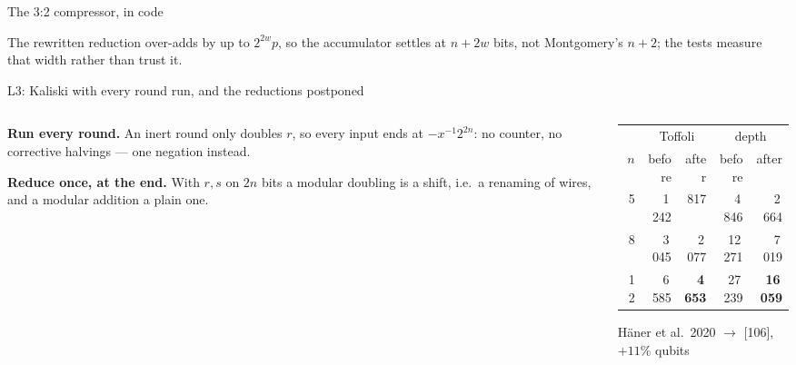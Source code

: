 \documentclass[aspectratio=169,11pt]{beamer}
\newcommand{\code}[2][]{}
\begin{document}
\setcounter{framenumber}{85}
\begin{frame}[fragile]{The 3:2 compressor, in code}
  \code[basicstyle=\ttfamily\fontsize{7.6}{8.8}\selectfont]{csa.py}
  {\small The rewritten reduction over-adds by up to $2^{2w}p$, so the accumulator settles at $n+2w$ bits, not Montgomery's $n+2$; the tests measure that width rather than trust it.}
\end{frame}

\setcounter{framenumber}{86}
\begin{frame}[fragile]{L3: Kaliski with every round run, and the reductions postponed}
  \begin{columns}[T]
    \begin{column}{0.54\textwidth}
      \small
      \textbf{Run every round.} An inert round only doubles $r$, so every input ends at $-x^{-1}2^{2n}$: no counter, no corrective halvings --- one negation instead.\par\vskip1mm
      \textbf{Reduce once, at the end.} With $r,s$ on $2n$ bits a modular doubling is a shift, i.e.\ a renaming of wires, and a modular addition a plain one.
    \end{column}
    \begin{column}{0.42\textwidth}
      \centering\footnotesize
      \renewcommand{\arraystretch}{1.08}
      \begin{tabular}{@{}rrrrr@{}}
        \toprule
        & \multicolumn{2}{c}{Toffoli} & \multicolumn{2}{c}{depth} \\
        $n$ & before & after & before & after \\
        \midrule
        5 & 1\,242 & 817 & 4\,846 & 2\,664 \\
        8 & 3\,045 & 2\,077 & 12\,271 & 7\,019 \\
        12 & 6\,585 & \textbf{4\,653} & 27\,239 & \textbf{16\,059} \\
        \bottomrule
      \end{tabular}\par
      {\scriptsize Häner et al.\ 2020 $\to$ [106], $+11\%$ qubits}
    \end{column}
  \end{columns}
  \code[basicstyle=\ttfamily\scriptsize]{kaliski_opt.py}
\end{frame}
\end{document}
